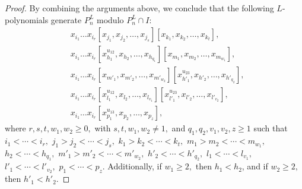 \documentclass[a4paper,reqno]{amsart}
\theoremstyle{definition}
\numberwithin{equation}{section}
\numberwithin{theorem}{section}
\begin{document}
\begin{proof}


By combining the arguments above, we conclude that the following $L$-polynomials generate $P_{n}^L$ modulo $P_{n}^L\cap I$:
\begin{equation}\label{No IdUT_3^e_1+be_2}
\begin{split}
&x_{i_{1}}\dots x_{i_{r}}[x_{j_1},x_{j_2},\dots,x_{j_s}][x_{k_1},x_{k_2},\dots,x_{k_t}],\\
&x_{i_{1}}\dots x_{i_{r}}[x_{h_1}^{u_{12}},x_{h_2},\dots,x_{h_{q_1}}][x_{m_1},x_{m_2},\dots,x_{m_{w_1}}],\\
&x_{i_{1}}\dots x_{i_{r}}[x_{m'_1},x_{m'_2},\dots,x_{m'_{w_2}}][x_{h'_1}^{u_{23}},x_{h'_2},\dots,x_{h'_{q_2}}],\\
&x_{i_{1}}\dots x_{i_{r}}[x_{l_1}^{u_{12}},x_{l_2},\dots,x_{l_{v_1}}][x_{l'_1}^{u_{23}},x_{l'_2},\dots,x_{l'_{v_2}}],\\
&x_{i_{1}}\dots x_{i_{r}}[x_{p_1}^{u_{13}},x_{p_2},\dots,x_{p_z}],
\end{split}
\end{equation}
where $r,s,t, w_1, w_2 \geq 0,$ with $s,t,w_1,w_2\neq 1,$ and $q_1,q_2,v_1,v_2,z\geq 1$ such that $i_1< \cdots < i_r,$ $j_1>j_2<  \cdots < j_s,$ $k_1>k_2<  \cdots < k_t,$ 
$m_1> m_2< \cdots < m_{w_1},$ $h_2< \cdots <h_{q_1},$  $m'_1> m'_2< \cdots < m'_{w_2},$  $h'_2< \cdots <h'_{q_2},$
$l_1< \cdots < l_{v_1},$ $l'_1< \cdots < l'_{v_2},$ $p_1< \cdots < p_z.$ Additionally, if $w_1\geq 2,$ then $h_1< h_2$, and  if $w_2\geq 2,$ then $h'_1< h'_2.$ 




\end{proof}
\end{document}
